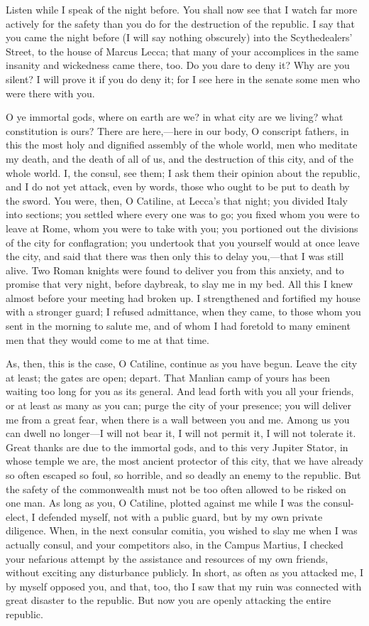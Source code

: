 \documentclass[a4paper]{amsbook}
\begin{document}
Listen while I speak of the night before. You shall now see that I watch far more actively for the safety than you do for the destruction of the republic. I say that you came the night before (I will say nothing obscurely) into the Scythedealers' Street, to the house of Marcus Lecca; that many of your accomplices in the same insanity and wickedness came there, too. Do you dare to deny it? Why are you silent? I will prove it if you do deny it; for I see here in the senate some men who were there with you.

O ye immortal gods, where on earth are we? in what city are we living? what constitution is ours? There are here,—here in our body, O conscript fathers, in this the most holy and dignified assembly of the whole world, men who meditate my death, and the death of all of us, and the destruction of this city, and of the whole world. I, the consul, see them; I ask them their opinion about the republic, and I do not yet attack, even by words, those who ought to be put to death by the sword. You were, then, O Catiline, at Lecca's that night; you divided Italy into sections; you settled where every one was to go; you fixed whom you were to leave at Rome, whom you were to take with you; you portioned out the divisions of the city for conflagration; you undertook that you yourself would at once leave the city, and said that there was then only this to delay you,—that I was still alive. Two Roman knights were found to deliver you from this anxiety, and to promise that very night, before daybreak, to slay me in my bed. All this I knew almost before your meeting had broken up. I strengthened and fortified my house with a stronger guard; I refused admittance, when they came, to those whom you sent in the morning to salute me, and of whom I had foretold to many eminent men that they would come to me at that time.

As, then, this is the case, O Catiline, continue as you have begun. Leave the city at least; the gates are open; depart. That Manlian camp of yours has been waiting too long for you as its general. And lead forth with you all your friends, or at least as many as you can; purge the city of your presence; you will deliver me from a great fear, when there is a wall between you and me. Among us you can dwell no longer—I will not bear it, I will not permit it, I will not tolerate it. Great thanks are due to the immortal gods, and to this very Jupiter Stator, in whose temple we are, the most ancient protector of this city, that we have already so often escaped so foul, so horrible, and so deadly an enemy to the republic. But the safety of the commonwealth must not be too often allowed to be risked on one man. As long as you, O Catiline, plotted against me while I was the consul-elect, I defended myself, not with a public guard, but by my own private diligence. When, in the next consular comitia, you wished to slay me when I was actually consul, and your competitors also, in the Campus Martius, I checked your nefarious attempt by the assistance and resources of my own friends, without exciting any disturbance publicly. In short, as often as you attacked me, I by myself opposed you, and that, too, tho I saw that my ruin was connected with great disaster to the republic. But now you are openly attacking the entire republic.
\end{document}
